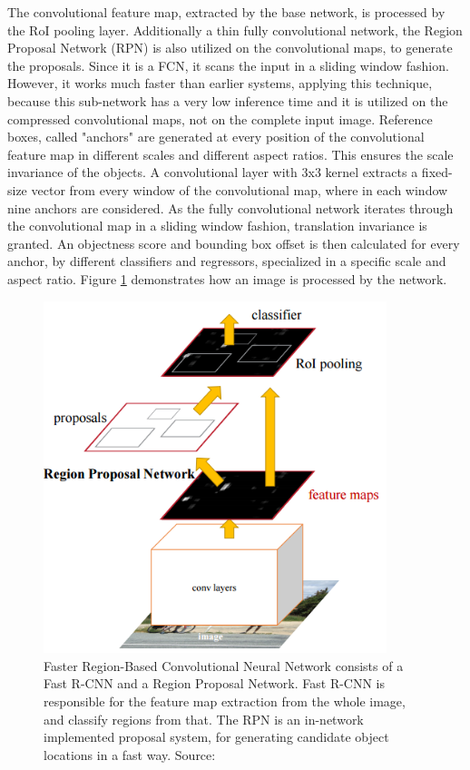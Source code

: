The convolutional feature map, extracted by the base network, is processed by the RoI pooling layer. Additionally a thin fully convolutional network, the Region Proposal Network (RPN) is also utilized on the convolutional maps, to generate the proposals. Since it is a FCN, it scans the input in a sliding window fashion. However, it works much faster than earlier systems, applying this technique, because this sub-network has a very low inference time and it is utilized on the compressed convolutional maps, not on the complete input image. Reference boxes, called "anchors" are generated at every position of the convolutional feature map in different scales and different aspect ratios. This ensures the scale invariance of the objects. A convolutional layer with 3x3 kernel extracts a fixed-size vector from every window of the convolutional map, where in each window nine anchors are considered. As the fully convolutional network iterates through the convolutional map in a sliding window fashion, translation invariance is granted. An objectness score and bounding box offset is then calculated for every anchor, by different classifiers and regressors, specialized in a specific scale and aspect ratio. Figure \ref{fig:faster-rcnn} demonstrates how an image is processed by the network.
\begin{figure}[h!]
	\centering
	\includegraphics[width=10cm]{images/mt/faster-rcnn.png}
	\caption{Faster Region-Based Convolutional Neural Network consists of a Fast R-CNN and a Region Proposal Network. Fast R-CNN is responsible for the feature map extraction from the whole image, and classify regions from that. The RPN is an in-network implemented proposal system, for generating candidate object locations in a fast way. Source: \cite{NIPS2015_5638}}
	\label{fig:faster-rcnn}
\end{figure}
\bigbreak
